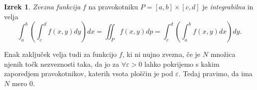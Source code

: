 \documentclass[11pt]{article}
\theoremstyle{definition}
\theoremstyle{definition}
\theoremstyle{definition}
\newtheorem{izrek}{Izrek}[section]
\begin{document}
\begin{izrek}

\textit{Zvezna funkcija} $f$ na pravokotniku $P = [a, b] \times [c, d]$ je \textit{integrabilna} in velja
\begin{equation}
\int_{a}^{b} \left( \int_{c}^{d} f(x, y) dy \right) dx = \iint_P f(x, y) dp = \int_{c}^{d} \left( \int_{a}^{b} f(x, y) dx \right) dy.
\end{equation}

Enak zaključek velja tudi za funkcijo $f$, ki ni nujno zvezna, če je $N$ množica njenih točk nezveznosti taka, da jo za $\forall \varepsilon > 0$ lahko pokrijemo s kakim zaporedjem pravokotnikov, katerih vsota ploščin je pod $\varepsilon$. Tedaj pravimo, da ima $N$ mero $0$.

\end{izrek}
\vspace{0.5cm}
\end{document}
